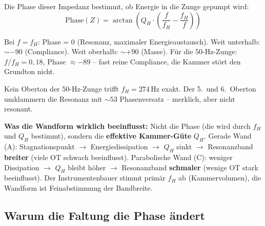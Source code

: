 \documentclass[11pt,a4paper]{article}
\begin{document}
Die Phase dieser Impedanz bestimmt, ob Energie in die Zunge gepumpt wird:
\begin{equation}
\text{Phase}(Z) = \arctan\!\left(Q_H \cdot \left(\frac{f}{f_H} - \frac{f_H}{f}\right)\right)
\end{equation}

Bei $f = f_H$: Phase = 0\textdegree{} (Resonanz, maximaler Energieaustausch). Weit unterhalb: $\sim -90$\textdegree{} (Compliance). Weit oberhalb: $\sim +90$\textdegree{} (Masse). Für die 50-Hz-Zunge: $f/f_H = 0{,}18$, Phase $\approx -89$\textdegree{} -- fast reine Compliance, die Kammer stört den Grundton nicht.

\begin{table}[H]
\centering\small
{}
\caption{Phase der Kammerimpedanz bei Obertönen einer 50-Hz-Zunge ($f_H = 274$\,Hz, $Q_H \approx 7$)}
\end{table}

Kein Oberton der 50-Hz-Zunge trifft $f_H = 274$\,Hz exakt. Der 5.\ und 6.\ Oberton umklammern die Resonanz mit $\sim 53$\textdegree{} Phasenversatz -- merklich, aber nicht resonant.

\begin{warnbox}
\textbf{Was die Wandform wirklich beeinflusst:} Nicht die Phase (die wird durch $f_H$ und $Q_H$ bestimmt), sondern die \textbf{effektive Kammer-Güte} $Q_H$. Gerade Wand (A): Stagnationspunkt $\to$ Energiedissipation $\to$ $Q_H$ sinkt $\to$ Resonanzband \textbf{breiter} (viele OT schwach beeinflusst). Parabolische Wand (C): weniger Dissipation $\to$ $Q_H$ bleibt höher $\to$ Resonanzband \textbf{schmaler} (wenige OT stark beeinflusst). Der Instrumentenbauer stimmt primär $f_H$ ab (Kammervolumen), die Wandform ist Feinabstimmung der Bandbreite.
\end{warnbox}

\subsection{Warum die Faltung die Phase ändert}
\end{document}
